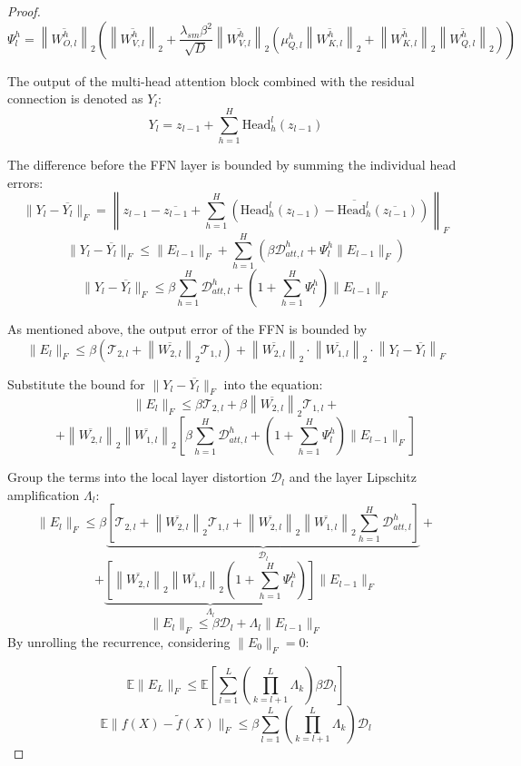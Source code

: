 \documentclass[a4paper,14pt]{extarticle}
\begin{document}
\begin{proof}
        $$\Psi_l^h = \left\|\overline{W_{O,l}^h}\right\|_2 \left( \left\|\overline{W_{V,l}^h}\right\|_2 + \frac{\lambda_{sm} \beta^2}{\sqrt{D}} \left\|\overline{W_{V,l}^h}\right\|_2 \left(\mu_{Q,l}^h \left\|\overline{W_{K,l}^h}\right\|_2 + \left\|\overline{W_{K,l}^h}\right\|_2 \left\|\overline{W_{Q,l}^h}\right\|_2\right) \right)$$

        The output of the multi-head attention block combined with the residual connection is denoted as $Y_l$:
        $$Y_l = z_{l-1} + \sum_{h=1}^H \text{Head}_h^l(z_{l-1})$$

        The difference before the FFN layer is bounded by summing the individual head errors:
        $$\|Y_l - \overline{Y_l}\|_F = \left\|z_{l-1} - \overline{z_{l-1}} + \sum_{h=1}^H \left( \text{Head}_h^l(z_{l-1}) - \overline{\text{Head}_h^l}(\overline{z_{l-1}}) \right)\right\|_F$$
        $$\|Y_l - \overline{Y_l}\|_F \leqslant \|E_{l-1}\|_F + \sum_{h=1}^H \left( \beta \mathcal{D}_{att, l}^h + \Psi_l^h \|E_{l-1}\|_F \right)$$
        $$\|Y_l - \overline{Y_l}\|_F \leqslant \beta \sum_{h=1}^H \mathcal{D}_{att, l}^h + \left( 1 + \sum_{h=1}^H \Psi_l^h \right) \|E_{l-1}\|_F$$
        
        As mentioned above, the output error of the FFN is bounded by
        $$ \|E_l\|_F \leqslant \beta (\mathcal{T}_{2,l} + \left\|\overline{W_{2,l}}\right\|_2 \mathcal{T}_{1,l}) + \left\|\overline{W_{2,l}}\right\|_2 \cdot \left\|\overline{W_{1,l}}\right\|_2 \cdot \left\|Y_l - \overline{Y_l}\right\|_F $$

        Substitute the bound for $\|Y_l - \overline{Y_l}\|_F$ into the equation:
        $$\|E_l\|_F \leqslant \beta \mathcal{T}_{2,l} + \beta \left\|\overline{W_{2,l}}\right\|_2 \mathcal{T}_{1,l} + $$
        $$+ \left\|\overline{W_{2,l}}\right\|_2 \left\|\overline{W_{1,l}}\right\|_2 \left[ \beta \sum_{h=1}^H \mathcal{D}_{att, l}^h + \left( 1 + \sum_{h=1}^H \Psi_l^h \right) \|E_{l-1}\|_F \right]$$
        
        Group the terms into the local layer distortion $\mathcal{D}_l$ and the layer Lipschitz amplification $\Lambda_l$:
        $$\|E_l\|_F \leqslant \beta \underbrace{\left[ \mathcal{T}_{2,l} + \left\|\overline{W_{2,l}}\right\|_2 \mathcal{T}_{1,l} + \left\|\overline{W_{2,l}}\right\|_2 \left\|\overline{W_{1,l}}\right\|_2 \sum_{h=1}^H \mathcal{D}_{att, l}^h \right]}_{\mathcal{D}_l} + $$
        $$+ \underbrace{\left[ \left\|\overline{W_{2,l}}\right\|_2 \left\|\overline{W_{1,l}}\right\|_2 \left( 1 + \sum_{h=1}^H \Psi_l^h \right) \right]}_{\Lambda_l} \|E_{l-1}\|_F$$
        $$\|E_l\|_F \leqslant \beta \mathcal{D}_l + \Lambda_l \|E_{l-1}\|_F$$
        By unrolling the recurrence, considering $\|E_0\|_F = 0$:

        $$\mathbb{E} \|E_L\|_F \leqslant \mathbb{E} \left[ \sum_{l=1}^L \left( \prod_{k=l+1}^L \Lambda_k \right) \beta \mathcal{D}_l \right]$$
        $$\mathbb{E} \|f(X) - \tilde{f}(X)\|_F \leqslant \beta \sum_{l=1}^L \left( \prod_{k=l+1}^L \Lambda_k \right) \mathcal{D}_l$$

    \end{proof}
\end{document}
